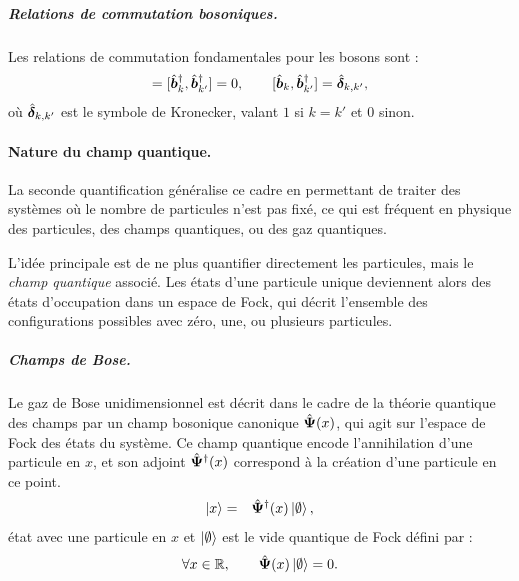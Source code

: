 \subparagraph{Relations de commutation bosoniques.} Les relations de commutation fondamentales pour les bosons sont :
\begin{eqnarray}
	[\operator{b}_k, \operator{b}_{k'}] = [\operator{b}_k^\dagger, \operator{b}_{k'}^\dagger] = 0 ,\qquad [\operator{b}_k, \operator{b}_{k'}^\dagger] = \operator{\delta}_{k,k'}, \label{chap:1:com.1.k}
\end{eqnarray}
où $\hat{\bm{\delta}}_{k,k'}$ est le symbole de Kronecker, valant $1$ si $k = k'$ et $0$ sinon.


\paragraph{Nature du champ quantique.}
La seconde quantification généralise ce cadre en permettant de traiter des systèmes où le nombre de particules n’est pas fixé, ce qui est fréquent en physique des particules, des champs quantiques, ou des gaz quantiques.

L’idée principale est de ne plus quantifier directement les particules, mais le \emph{champ quantique} associé. Les états d’une particule unique deviennent alors des états d’occupation dans un espace de Fock, qui décrit l’ensemble des configurations possibles avec zéro, une, ou plusieurs particules.



\subparagraph{Champs de Bose.}
Le gaz de Bose unidimensionnel est décrit dans le cadre de la théorie quantique des champs par un champ bosonique canonique \( \hat{\bm{\Psi}}(x) \), qui agit sur l’espace de Fock des états du système. Ce champ quantique encode l’annihilation d’une particule en \( x \), et son adjoint \( \hat{\bm{\Psi}}^\dag(x) \) correspond à la création d’une particule en ce point. 
\begin{eqnarray}
	\vert x \rangle  & = & \hat{\bm{\Psi}}^\dag (x)\ket{\emptyset} ,
\end{eqnarray}
état avec une particule en  $x$ et \(\ket{\emptyset}\) est le vide quantique de Fock défini par :
\begin{eqnarray}
	\forall x \in \mathbb{R}, \qquad \hat{\bm{\Psi}}(x) \ket{\emptyset} = 0. \label{chap:eq.vide.fock}
\end{eqnarray}

